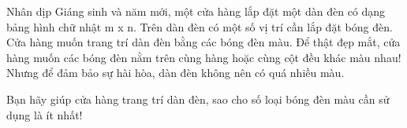 Nhân dịp Giáng sinh và năm mới, một cửa hàng lắp đặt một dàn đèn có dạng bảng hình chữ nhật m x n. Trên dàn đèn có một số vị trí cần lắp đặt   bóng đèn. Cửa hàng muốn trang trí dàn đèn bằng các bóng đèn màu. Để thật đẹp mắt, cửa hàng muốn các bóng đèn nằm trên cùng hàng hoặc cùng cột   đều khác màu nhau! Nhưng để đảm bảo sự hài hòa, dàn đèn không nên có quá nhiều màu.  

   Bạn hãy giúp cửa hàng trang trí dàn đèn, sao cho số loại bóng đèn màu cần sử dụng là ít nhất!  

\